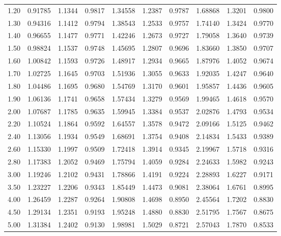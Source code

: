 {\begin{longtable}{|||d{3.2}|X|X|X|||}
1.20   & 0.91785  & 1.1344  & 0.9817  & 1.34558   & 1.2387  & 0.9787  & 1.68868  & 1.3201  & 0.9800 \\ 
1.30   & 0.94316  & 1.1412  & 0.9794  & 1.38543   & 1.2533  & 0.9757  & 1.74140  & 1.3424  & 0.9770 \\  
1.40   & 0.96655  & 1.1477  & 0.9771  & 1.42246   & 1.2673  & 0.9727  & 1.79058  & 1.3640  & 0.9739 \\  
1.50   & 0.98824  & 1.1537  & 0.9748  & 1.45695   & 1.2807  & 0.9696  & 1.83660  & 1.3850  & 0.9707 \\ 
1.60   & 1.00842  & 1.1593  & 0.9726  & 1.48917   & 1.2934  & 0.9665  & 1.87976  & 1.4052  & 0.9674 \\  
1.70   & 1.02725  & 1.1645  & 0.9703  & 1.51936   & 1.3055  & 0.9633  & 1.92035  & 1.4247  & 0.9640 \\* 
1.80   & 1.04486  & 1.1695  & 0.9680  & 1.54769   & 1.3170  & 0.9601  & 1.95857  & 1.4436  & 0.9605 \\*  
1.90   & 1.06136  & 1.1741  & 0.9658  & 1.57434   & 1.3279  & 0.9569  & 1.99465  & 1.4618  & 0.9570 \\[6pt]  
%
2.00   & 1.07687  & 1.1785  & 0.9635  & 1.59945   & 1.3384  & 0.9537  & 2.02876  & 1.4793  & 0.9534 \\*  
2.20   & 1.10524  & 1.1864  & 0.9592  & 1.64557   & 1.3578  & 0.9472  & 2.09166  & 1.5125  & 0.9462 \\  
2.40   & 1.13056  & 1.1934  & 0.9549  & 1.68691   & 1.3754  & 0.9408  & 2.14834  & 1.5433  & 0.9389 \\  
2.60   & 1.15330  & 1.1997  & 0.9509  & 1.72418   & 1.3914  & 0.9345  & 2.19967  & 1.5718  & 0.9316 \\  
2.80   & 1.17383  & 1.2052  & 0.9469  & 1.75794   & 1.4059  & 0.9284  & 2.24633  & 1.5982  & 0.9243 \\ 
3.00   & 1.19246  & 1.2102  & 0.9431  & 1.78866   & 1.4191  & 0.9224  & 2.28893  & 1.6227  & 0.9171 \\     
3.50   & 1.23227  & 1.2206  & 0.9343  & 1.85449   & 1.4473  & 0.9081  & 2.38064  & 1.6761  & 0.8995 \\     
4.00   & 1.26459  & 1.2287  & 0.9264  & 1.90808   & 1.4698  & 0.8950  & 2.45564  & 1.7202  & 0.8830 \\*   
4.50   & 1.29134  & 1.2351  & 0.9193  & 1.95248   & 1.4880  & 0.8830  & 2.51795  & 1.7567  & 0.8675 \\*    
5.00   & 1.31384  & 1.2402  & 0.9130  & 1.98981   & 1.5029  & 0.8721  & 2.57043  & 1.7870  & 0.8533 \\[6pt]    

\end{longtable}}
